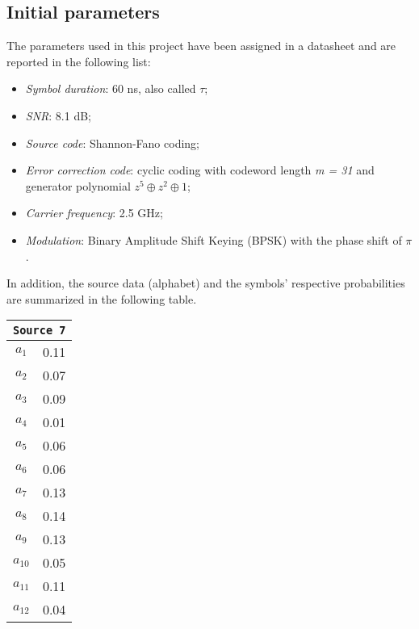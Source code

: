\subsection{Initial parameters}\label{initial-parameters}
The parameters used in this project have been assigned in a datasheet and are reported in the following list:
\vspace{-5px}
\begin{itemize}
    \renewcommand{\labelitemi}{$\cdot$}
    \setlength{\itemsep}{-2px}
    \item \textsl{Symbol duration}: 60 ns, also called $\tau$;
    \item \textsl{SNR}: 8.1 dB;
    \item \textsl{Source code}: Shannon-Fano coding;
    \item \textsl{Error correction code}: cyclic coding with codeword length \textit{m = 31} and generator polynomial $ z^5 \oplus z^2 \oplus 1$;
    \item \textsl{Carrier frequency}: 2.5 GHz;
    \item \textsl{Modulation}: Binary Amplitude Shift Keying (BPSK) with the phase shift of $\pi$.
\end{itemize}

\noindent In addition, the source data (alphabet) and the symbols' respective probabilities are summarized in the following table.

\begin{table}[h!]
    \centering
    \begin{tabular}{|c|c|}
        \hline
        \multicolumn{2}{|c|}{\texttt{Source 7}} \\\hline\hline
        $ a_1 $ & 0.11 \\
        $ a_2 $ & 0.07 \\
        $ a_3 $ & 0.09 \\
        $ a_4 $ & 0.01 \\
        $ a_5 $ & 0.06 \\
        $ a_6 $ & 0.06 \\
        $ a_7 $ & 0.13 \\
        $ a_8 $ & 0.14 \\
        $ a_9 $ & 0.13 \\
        $ a_{10} $ & 0.05 \\
        $ a_{11} $ & 0.11 \\
        $ a_{12} $ & 0.04 \\\hline
    \end{tabular}
    \label{tab:source7}
\end{table}

